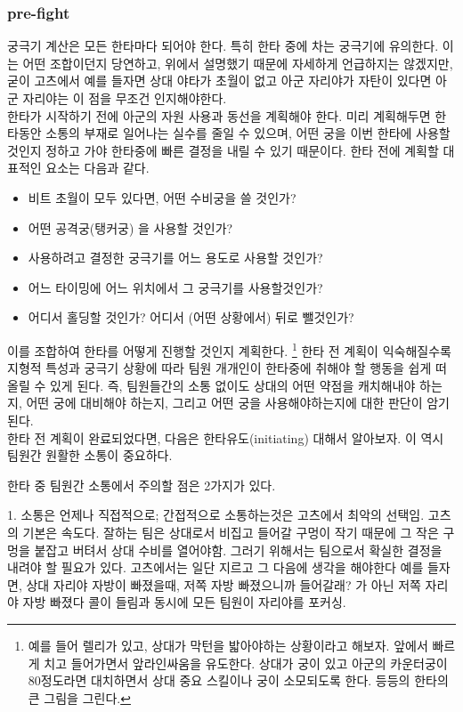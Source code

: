 \subsubsection{pre-fight}
궁극기 계산은 모든 한타마다 되어야 한다. 특히 한타 중에 차는 궁극기에 유의한다. 이는 어떤 조합이던지 당연하고, 위에서 설명했기 때문에 자세하게 언급하지는 않겠지만, 굳이 고츠에서 예를 들자면 상대 야타가 초월이 없고 아군 자리야가 자탄이 있다면 아군 자리야는 이 점을 무조건 인지해야한다. \\ 

한타가 시작하기 전에 아군의 자원 사용과 동선을 계획해야 한다. 미리 계획해두면 한타동안 소통의 부재로 일어나는 실수를 줄일 수 있으며, 어떤 궁을 이번 한타에 사용할 것인지 정하고 가야 한타중에 빠른 결정을 내릴 수 있기 때문이다. 한타 전에 계획할 대표적인 요소는 다음과 같다.
\begin{itemize}
    \item 비트 초월이 모두 있다면, 어떤 수비궁을 쓸 것인가?
    \item 어떤 공격궁(탱커궁) 을 사용할 것인가?
    \item 사용하려고 결정한 궁극기를 어느 용도로 사용할 것인가?
    \item 어느 타이밍에 어느 위치에서 그 궁극기를 사용할것인가?
    \item 어디서 홀딩할 것인가? 어디서 (어떤 상황에서) 뒤로 뺄것인가?
\end{itemize}
이를 조합하여 한타를 어떻게 진행할 것인지 계획한다.
\footnote{예를 들어 렐리가 있고, 상대가 막턴을 밟아야하는 상황이라고 해보자. 앞에서 빠르게 치고 들어가면서 앞라인싸움을 유도한다. 상대가 궁이 있고 아군의 카운터궁이 80정도라면 대치하면서 상대 중요 스킬이나 궁이 소모되도록 한다. 등등의 한타의 큰 그림을 그린다.}
 한타 전 계획이 익숙해질수록 지형적 특성과 궁극기 상황에 따라 팀원 개개인이 한타중에 취해야 할 행동을 쉽게 떠올릴 수 있게 된다. 즉, 팀원들간의 소통 없이도 상대의 어떤 약점을 캐치해내야 하는지, 어떤 궁에 대비해야 하는지, 그리고 어떤 궁을 사용해야하는지에 대한 판단이 암기된다. \\
한타 전 계획이 완료되었다면, 다음은 한타유도(initiating) 대해서 알아보자. 이 역시 팀원간 원활한 소통이 중요하다.

한타 중 팀원간 소통에서 주의할 점은 2가지가 있다.

 1. 소통은 언제나 직접적으로; 간접적으로 소통하는것은 고츠에서 최악의 선택임.
고츠의 기본은 속도다. 잘하는 팀은 상대로서 비집고 들어갈 구멍이 작기 때문에 그 작은 구멍을 붙잡고 버텨서 상대 수비를 열어야함. 
그러기 위해서는 팀으로서 확실한 결정을 내려야 할 필요가 있다. 고츠에서는 일단 지르고 그 다음에 생각을 해야한다
예를 들자면, 상대 자리야 자방이 빠졌을때, 저쪽 자방 빠졌으니까 들어갈래? 가 아닌 저쪽 자리야 자방 빠졌다 콜이 들림과 동시에 모든 팀원이 자리야를 포커싱.

